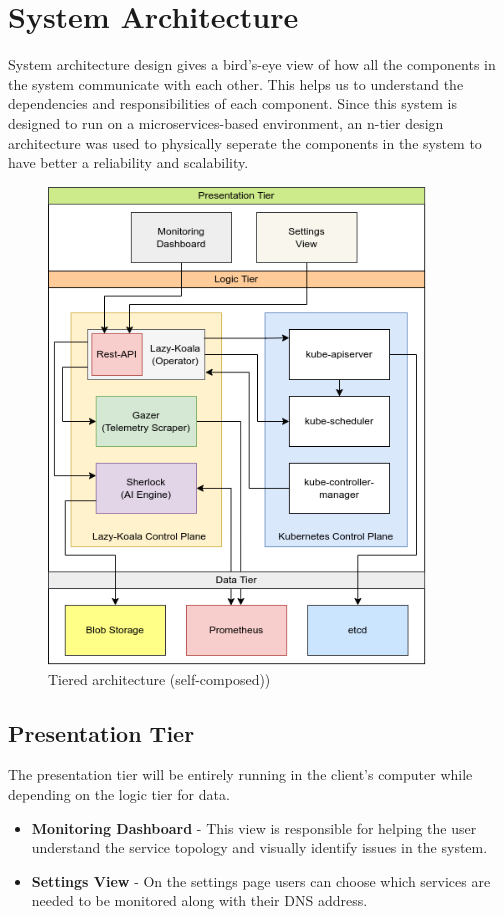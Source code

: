 \section{System Architecture}

System architecture design gives a bird's-eye view of how all the components in the system communicate with each other. This helps us to understand the dependencies and responsibilities of each component. Since this system is designed to run on a microservices-based environment, an n-tier design architecture was used to physically seperate the components in the system to have better a reliability and scalability.

\begin{figure}[H]
    \includegraphics[width=10cm]{assets/system-design/tier-architecture.png}
    \caption{Tiered architecture (self-composed))}
    \label{fig:tier-architecture}
\end{figure}

\subsection{Presentation Tier}

The presentation tier will be entirely running in the client's computer while depending on the logic tier for data.

\begin{itemize}[noitemsep,nolistsep] 
    \item \textbf{Monitoring Dashboard} - This view is responsible for helping the user understand the service topology and visually identify issues in the system.
    \item \textbf{Settings View} - On the settings page users can choose which services are needed to be monitored along with their DNS address.
\end{itemize}

